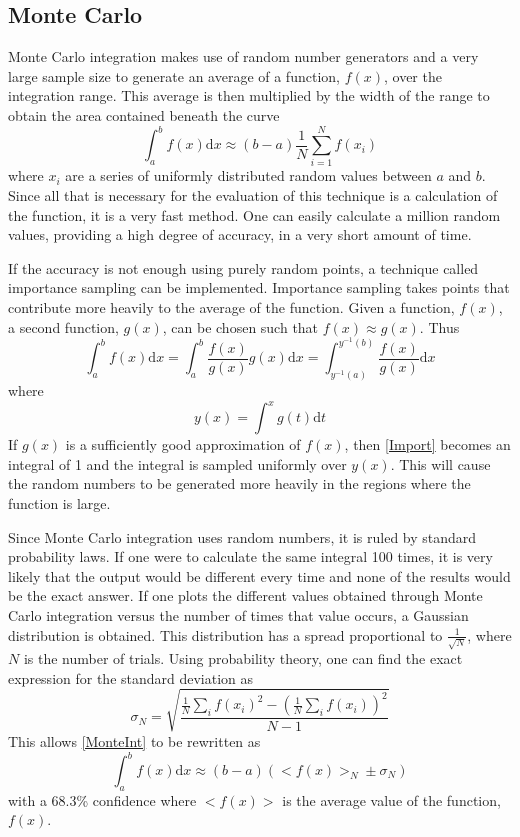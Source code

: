 \documentclass[12pt]{article}
\begin{document}
\subsection{Monte Carlo}
Monte Carlo integration makes use of random number generators and a very large sample size to generate an average of a function, $f(x)$, over the integration range.  This average is then multiplied by the width of the range to obtain the area contained beneath the curve
\begin{equation}
\label{MonteInt}
\int_a^b f(x) \mathrm{d}x \approx (b-a) \frac{1}{N}\sum_{i=1}^N f(x_i)
\end{equation}
where $x_i$ are a series of uniformly distributed random values between $a$ and $b$.  Since all that is necessary for the evaluation of this technique is a calculation of the function, it is a very fast method.  One can easily calculate a million random values, providing a high degree of accuracy, in a very short amount of time.


If the accuracy is not enough using purely random points, a technique called importance sampling can be implemented.  Importance sampling takes points that contribute more heavily to the average of the function.  Given a function, $f(x)$, a second function, $g(x)$, can be chosen such that $f(x) \approx g(x)$.  Thus
\begin{equation}
\label{Import}
\int_a^b f(x) \mathrm{d}x = \int_a^b \frac{f(x)}{g(x)} g(x) \mathrm{d}x = \int_{y^{-1}(a)}^{y^{-1}(b)}  \frac{f(x)}{g(x)} \mathrm{d}x
\end{equation}
where
\begin{equation}
\label{ImportY}
y(x) = \int^x g(t) \mathrm{d}t 
\end{equation}
If $g(x)$ is a sufficiently good approximation of $f(x)$, then \eqref{Import} becomes an integral of 1 and the integral is sampled uniformly over $y(x)$.  This will cause the random numbers to be generated more heavily in the regions where the function is large.


Since Monte Carlo integration uses random numbers, it is ruled by standard probability laws.  If one were to calculate the same integral 100 times, it is very likely that the output would be different every time and none of the results would be the exact answer.  If one plots the different values obtained through Monte Carlo integration versus the number of times that value occurs, a Gaussian distribution is obtained.  This distribution has a spread proportional to $\frac{1}{\sqrt{N}}$, where $N$ is the number of trials.  Using probability theory, one can find the exact expression for the standard deviation as
\begin{equation}
\label{StDev}
\sigma_N = \sqrt{\frac{\frac{1}{N}\sum_i f(x_i)^2-(\frac{1}{N} \sum_i f(x_i))^2}{N-1}}
\end{equation}
This allows \eqref{MonteInt} to be rewritten as
\begin{equation}
\label{MonteIntSigma}
\int_a^b f(x) \mathrm{d}x \approx (b-a) (<f(x)>_N \pm \sigma_N)
\end{equation}
with a 68.3\% confidence where $<f(x)>$ is the average value of the function, $f(x)$.
\end{document}
